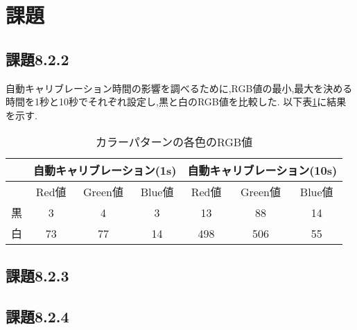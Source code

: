 \documentclass{jarticle}
\begin{document}
\section{課題}

\subsection{課題8.2.2}

自動キャリブレーション時間の影響を調べるために,RGB値の最小,最大を決める時間を1秒と10秒でそれぞれ設定し,黒と白のRGB値を比較した.
以下表\ref{table:kadai8-2-2}に結果を示す.
\begin{table}[H]
\caption{カラーパターンの各色のRGB値}
	\begin{center}
		\begin{tabular}{|c|c|c|c|c|c|c|}\hline 
			& \multicolumn{3}{c|}{自動キャリブレーション(1s)}&\multicolumn{3}{c|}{自動キャリブレーション(10s)} \\ \hline 
			& Red値 & Green値 & Blue値& Red値 & Green値 & Blue値 \\ \hline
		黒 & 3 & 4 & 3 & 13 & 88 & 14 \\	 \hline
		白 & 73& 77& 14& 498& 506& 55\\ \hline 
		\end{tabular}
	\end{center}
\label{table:kadai8-2-2} 
\end{table}


\subsection{課題8.2.3}


\subsection{課題8.2.4}
\end{document}
